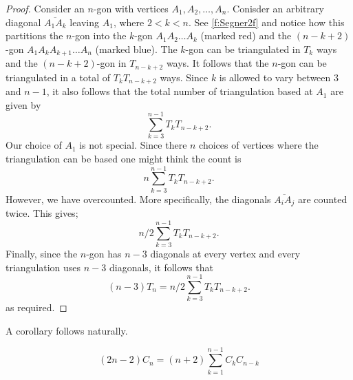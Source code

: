 \begin{proof}
Consider an $n$-gon with vertices $A_1,A_2,\ldots,A_n$. Conisder an arbitrary diagonal $\overline{A_1A_k}$ leaving $A_1$, where $2<k<n$. See \cref{f:Segner2f} and notice how this partitions the $n$-gon into the $k$-gon $A_1A_2\ldots A_k$ (marked red) and the $(n-k+2)$-gon $A_1A_kA_{k+1}\ldots A_n$ (marked blue). The $k$-gon can be triangulated in $T_k$ ways and the $(n-k+2)$-gon in $T_{n-k+2}$ ways. It follows that the $n$-gon can be triangulated in a total of $T_kT_{n-k+2}$ ways. Since $k$ is allowed to vary between $3$ and $n-1$, it also follows that the total number of triangulation based at $A_1$ are given by \[
\sum_{k=3}^{n-1}T_kT_{n-k+2}.
\]
Our choice of $A_1$ is not special. Since there $n$ choices of vertices where the triangulation can be based one might think the count is
\[
n\sum_{k=3}^{n-1}T_kT_{n-k+2}.
\]
However, we have overcounted. More specifically, the diagonals $\overline{A_iA_j}$ are counted twice. This gives;
\[
n/2\sum_{k=3}^{n-1}T_kT_{n-k+2}.
\]
Finally, since the $n$-gon has $n-3$ diagonals at every vertex and every triangulation uses $n-3$ diagonals, it follows that
\[
(n-3)T_n = n/2\sum_{k=3}^{n-1}T_kT_{n-k+2}.
\]
as required.
\end{proof}
A corollary follows naturally.
\begin{corollary}
\[
(2n-2)C_n = (n+2)\sum_{k=1}^{n-1}C_kC_{n-k}
\]
\end{corollary}